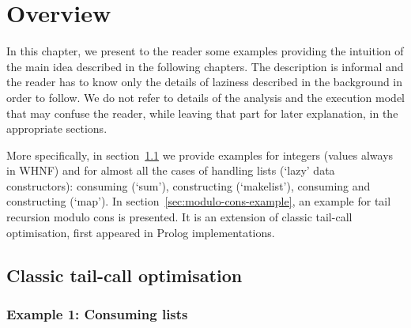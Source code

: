 \documentclass[diploma]{softlab-thesis}
\begin{document}
\chapter {Overview}
\label{ch:overview}

In this chapter, we present to the reader some examples providing the intuition of the main idea described 
in the following chapters. The description is informal and the reader has to know only the details of laziness 
described in the background in order to follow. We do not refer to details of the analysis and the execution model 
that may confuse the reader, while leaving that part for later explanation, in the appropriate sections.

More specifically, in section~\ref{sec:classic-tco-examples} we provide examples for integers (values always in WHNF) and 
for almost all the cases of handling lists (`lazy' data constructors): 
consuming (`sum'), constructing (`makelist'), consuming and constructing (`map'). 
In section~\ref{sec:modulo-cons-example}, an example for tail recursion modulo cons is presented. It is an extension of classic 
tail-call optimisation, first appeared in Prolog implementations.


\section {Classic tail-call optimisation}
\label{sec:classic-tco-examples}





\subsection {Example 1: Consuming lists}
\label{sec:example1}
\end{document}
